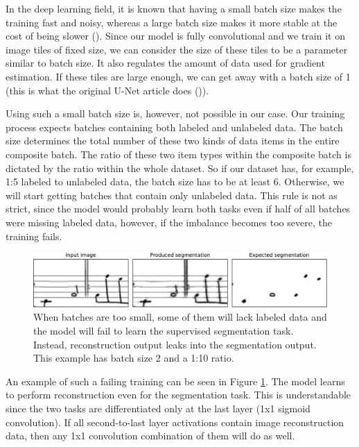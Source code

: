 In the deep learning field, it is known that having a small batch size makes the training fast and noisy, whereas a large batch size makes it more stable at the cost of being slower (\cite{DeepLearningBook}). Since our model is fully convolutional and we train it on image tiles of fixed size, we can consider the size of these tiles to be a parameter similar to batch size. It also regulates the amount of data used for gradient estimation. If these tiles are large enough, we can get away with a batch size of 1 (this is what the original U-Net article does (\cite{UNet})).

Using such a small batch size is, however, not possible in our case. Our training process expects batches containing both labeled and unlabeled data. The batch size determines the total number of these two kinds of data items in the entire composite batch. The ratio of these two item types within the composite batch is dictated by the ratio within the whole dataset. So if our dataset has, for example, 1:5 labeled to unlabeled data, the batch size has to be at least 6. Otherwise, we will start getting batches that contain only unlabeled data. This rule is not as strict, since the model would probably learn both tasks even if half of all batches were missing labeled data, however, if the imbalance becomes too severe, the training fails.

\begin{figure}[ht]
    \centering
    \includegraphics[width=145mm]{../../figures/07-small-batches/small-batches.pdf}
    \caption{When batches are too small, some of them will lack labeled data and the model will fail to learn the supervised segmentation task. Instead, reconstruction output leaks into the segmentation output. This example has batch size 2 and a 1:10 ratio.}
    \label{fig:SmallBatches}
\end{figure}

An example of such a failing training can be seen in Figure \ref{fig:SmallBatches}. The model learns to perform reconstruction even for the segmentation task. This is understandable since the two tasks are differentiated only at the last layer (1x1 sigmoid convolution). If all second-to-last layer activations contain image reconstruction data, then any 1x1 convolution combination of them will do as well.

